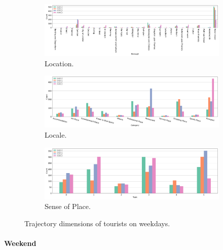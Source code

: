\documentclass{article}
\newcommand{\subsubsubsection}[1]{\paragraph{#1}\mbox{}\\}
\theoremstyle{definition}
\theoremstyle{remark}
\begin{document}
\begin{figure}[!h]

\centering
\begin{subfigure}{0.6\textheight}
\centering
\includegraphics[width=1\linewidth]{figures/traj_location_weekday_tourists.png}
\caption{Location.}
\label{fig:traj_location_weekday_tourists}
\end{subfigure}
\begin{subfigure}{0.6\textheight}
\centering
\includegraphics[width=1\linewidth]{figures/traj_locale_weekday_tourists.png}
\caption{Locale.}
\label{fig:traj_locale_weekday_tourists}
\end{subfigure}
\begin{subfigure}{0.6\textheight}
\centering
\includegraphics[width=1\linewidth]{figures/traj_sense_weekday_tourists.png}
\caption{Sense of Place.}
\label{fig:traj_sense_weekday_tourists}
\end{subfigure}

\caption{Trajectory dimensions of tourists on weekdays.}
\label{fig:traj_dimension_weekday_tourists}
\end{figure}


\subsubsubsection{Weekend}
\end{document}
